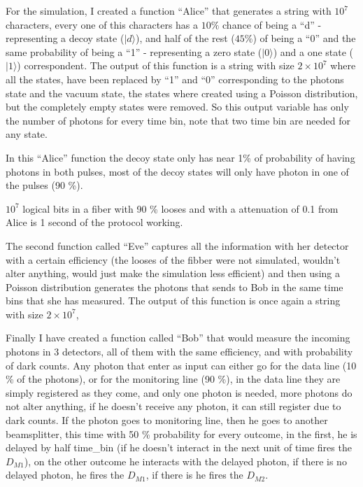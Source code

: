 \begin{refsection}
For the simulation, I created a function ``Alice'' that generates a string with $10^7$ characters, every one of this characters has a $10 \%$ chance of being a ``d'' - representing a decoy state ($|d\rangle$), and half of the rest ($45 \%$) of being a ``0'' and the same probability of being a ``1'' - representing a zero state ($|0\rangle$) and a one state ($|1\rangle$) correspondent. The output of this function is a string with size $2\times10^7$ where all the states, have been replaced by ``1'' and ``0'' corresponding to the photons state and the vacuum state, the states where created using a Poisson distribution, but the completely empty states were removed. So this output variable has only the number of photons for every time bin, note that two time bin are needed for any state.

In this ``Alice'' function the decoy state only has near 1\% of probability of having photons in both pulses, most of the decoy states will only have photon in one of the pulses (90 \%).

$10^7$ logical bits in a fiber with 90 \% looses and with a attenuation of 0.1 from Alice is 1 second of the protocol working.

The second function called ``Eve'' captures all the information with her detector with a certain efficiency (the looses of the fibber were not simulated, wouldn't alter anything, would just make the simulation less efficient)  and then using a Poisson distribution generates the photons that sends to Bob in the same time bins that she has measured. The output of this function is once again a string with size $2\times10^7$,

Finally I have created a function called ``Bob'' that would measure the incoming photons in 3 detectors, all of them with the same efficiency, and with probability of dark counts. Any photon that enter as input can either go for the data line (10 \% of the photons), or for the monitoring line (90 \%), in the data line they are simply registered as they come, and only one photon is needed, more photons do not alter anything, if he doesn't receive any photon, it can still register due to dark counts. If the photon goes to monitoring line, then he goes to another beamsplitter, this time with 50 \% probability for every outcome, in the first, he is delayed by half time_bin (if he doesn't interact in the next unit of time fires the $D_{M1}$), on the other outcome he interacts with the delayed photon, if there is no delayed photon, he fires the $D_{M1}$, if there is he fires the $D_{M2}$.


\end{refsection}
